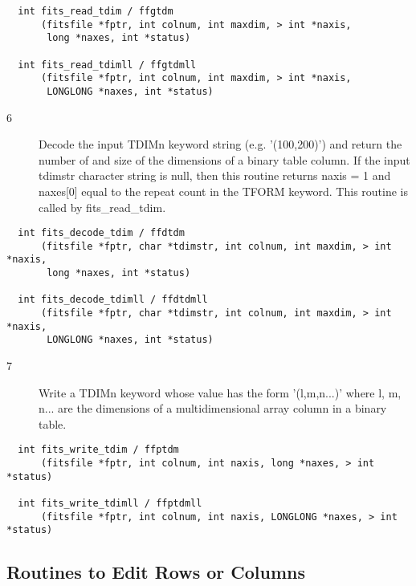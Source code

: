 \documentclass[11pt]{book}
\begin{document}
\begin{verbatim}
  int fits_read_tdim / ffgtdm
      (fitsfile *fptr, int colnum, int maxdim, > int *naxis,
       long *naxes, int *status)

  int fits_read_tdimll / ffgtdmll
      (fitsfile *fptr, int colnum, int maxdim, > int *naxis,
       LONGLONG *naxes, int *status)
\end{verbatim}

\begin{description}
\item[6 ] Decode the input TDIMn keyword string (e.g. '(100,200)') and return the
    number of and size of the dimensions of a binary table column. If the input
    tdimstr character string is null, then this routine returns naxis = 1
    and naxes[0] equal to the repeat count in the TFORM keyword. This routine
   is called by fits\_read\_tdim.  \label{ffdtdm}
\end{description}

\begin{verbatim}
  int fits_decode_tdim / ffdtdm
      (fitsfile *fptr, char *tdimstr, int colnum, int maxdim, > int *naxis,
       long *naxes, int *status)

  int fits_decode_tdimll / ffdtdmll
      (fitsfile *fptr, char *tdimstr, int colnum, int maxdim, > int *naxis,
       LONGLONG *naxes, int *status)
\end{verbatim}

\begin{description}
\item[7 ] Write a TDIMn keyword whose value has the form '(l,m,n...)'
    where l, m, n... are the dimensions of a multidimensional array
   column in a binary table. \label{ffptdm}
\end{description}

\begin{verbatim}
  int fits_write_tdim / ffptdm
      (fitsfile *fptr, int colnum, int naxis, long *naxes, > int *status)

  int fits_write_tdimll / ffptdmll
      (fitsfile *fptr, int colnum, int naxis, LONGLONG *naxes, > int *status)
\end{verbatim}


\subsection{Routines to Edit Rows or Columns}
\end{document}
